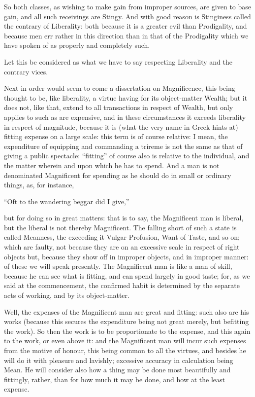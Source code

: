 So both classes, as wishing to make gain from improper sources, are given to
base gain, and all such receivings are Stingy. And with good reason is
Stinginess called the contrary of Liberality: both because it is a greater evil
than Prodigality, and because men err rather in this direction than in that of
the Prodigality which we have spoken of as properly and completely such.

Let this be considered as what we have to say respecting Liberality and the
contrary vices.


Next in order would seem to come a dissertation on Magnificence, this being
thought to be, like liberality, a virtue having for its object-matter Wealth;
but it does not, like that, extend to all transactions in respect of Wealth,
but only applies to such as are expensive, and in these circumstances it
exceeds liberality in respect of magnitude, because it is (what the very name
in Greek hints at) fitting expense on a large scale: this term is of course
relative: I mean, the expenditure of equipping and commanding a trireme is not
the same as that of giving a public spectacle: “fitting” of course
also is relative to the individual, and the matter wherein and upon which he
has to spend. And a man is not denominated Magnificent for spending as he
should do in small or ordinary things, as, for instance,

“Oft to the wandering beggar did I give,”

but for doing so in great matters: that is to say, the Magnificent man is
liberal, but the liberal is not thereby Magnificent. The falling short of such
a state is called Meanness, the exceeding it Vulgar Profusion, Want of Taste,
and so on; which are faulty, not because they are on an excessive scale in
respect of right objects but, because they show off in improper objects, and in
improper manner: of these we will speak presently. The Magnificent man is like
a man of skill, because he can see what is fitting, and can spend largely in
good taste; for, as we said at the commencement, the confirmed habit is
determined by the separate acts of working, and by its object-matter.

Well, the expenses of the Magnificent man are great and fitting: such also are
his works (because this secures the expenditure being not great merely, but
befitting the work). So then the work is to be proportionate to the expense,
and this again to the work, or even above it: and the Magnificent man will
incur such expenses from the motive of honour, this being common to all the
virtues, and besides he will do it with pleasure and lavishly; excessive
accuracy in calculation being Mean. He will consider also how a thing may be
done most beautifully and fittingly, rather, than for how much it may be done,
and how at the least expense.

